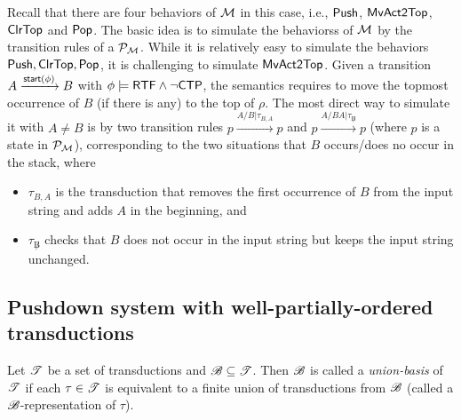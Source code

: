 {Recall that there are four behaviors of ${\mathcal{M} }$ in this case, i.e., $\mathsf{Push}$, $\mathsf{MvAct2Top}$, $\mathsf{ClrTop}$ and $\mathsf{Pop}$.
The basic idea is to simulate the behaviorss of ${\mathcal{M} }$ by the transition rules of a {\TrPDS} ${\mathcal{P} }_{{\mathcal{M} }}$. While it is relatively easy to simulate the behaviors $\mathsf{Push}, \mathsf{ClrTop}, \mathsf{Pop}$, %
it is challenging to simulate $\mathsf{MvAct2Top}$. Given a transition $A\xrightarrow{{\mathsf{start} }(\phi)}B$ with $\phi\models{\sf RTF}\wedge\neg{\sf CTP}$, the semantics requires to move the topmost occurrence of $B$ (if there is any) to the top of $\rho$. The most direct way to simulate it with $A \neq B$ is by two transition rules $p \xrightarrow{A / B | \tau_{B, A}} p$ and  $p \xrightarrow{A / BA | \tau_{\not B}} p$
(where $p$ is a state in ${\mathcal{P} }_{\mathcal{M} }$), corresponding to the two situations that $B$ occurs/does no occur in the stack, where 
\begin{itemize}
\item $\tau_{B, A}$ is the transduction that removes the first occurrence of $B$ from the input string and adds $A$ in the beginning, and
%
\item $\tau_{\not B}$ checks that $B$ does not occur in the input string but keeps the input string unchanged. 
\end{itemize}
}

\subsection{Pushdown system with well-partially-ordered transductions}\label{sec-wpotrpds}

\begin{definition}\label{def-ubasis}
Let ${\mathscr{T} }$ be a set of transductions and ${\mathscr{B} } \subseteq {\mathscr{T} }$. Then ${\mathscr{B} }$ is called a \emph{union-basis} of ${\mathscr{T} }$ if each $\tau \in {\mathscr{T} }$ is equivalent to a finite union of transductions from ${\mathscr{B} }$ (called a ${\mathscr{B} }$-representation of $\tau$). 
\end{definition}

